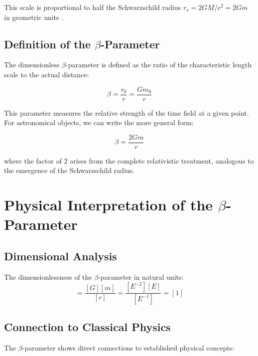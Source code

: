 	This scale is proportional to half the Schwarzschild radius $r_s = 2GM/c^2 = 2Gm$ in geometric units \citep{misner1973,carroll2004}.
	
	\subsection{Definition of the $\beta$-Parameter}
	\label{subsec:beta_definition}
	
	The dimensionless $\beta$-parameter is defined as the ratio of the characteristic length scale to the actual distance:
	
	\begin{equation}
		\boxed{\beta = \frac{r_0}{r} = \frac{G m_0}{r}}
	\end{equation}
	
	This parameter measures the relative strength of the time field at a given point. For astronomical objects, we can write the more general form:
	
	\begin{equation}
		\boxed{\beta = \frac{2Gm}{r}}
	\end{equation}
	
	where the factor of 2 arises from the complete relativistic treatment, analogous to the emergence of the Schwarzschild radius.
	
	\section{Physical Interpretation of the $\beta$-Parameter}
	\label{sec:physical_interpretation}
	
	\subsection{Dimensional Analysis}
	\label{subsec:dimensional_analysis}
	
	The dimensionlessness of the $\beta$-parameter in natural units:
	\begin{equation}
		[\beta] = \frac{[G][m]}{[r]} = \frac{[E^{-2}][E]}{[E^{-1}]} = [1]
	\end{equation}
	
	\subsection{Connection to Classical Physics}
	\label{subsec:classical_connection}
	
	The $\beta$-parameter shows direct connections to established physical concepts:
	
